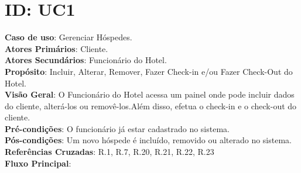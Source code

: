 \documentclass[notitlepage]{article}
\begin{document}
\section{ID: UC1}
\noindent\textbf{Caso de uso}: Gerenciar Hóspedes.\\
\textbf{Atores Primários}: Cliente. \\
\textbf{Atores Secundários}: Funcionário do Hotel.\\
\textbf{Propósito}: Incluir, Alterar, Remover, Fazer Check-in e/ou Fazer Check-Out do Hotel.\\
\textbf{Visão Geral}: O Funcionário do Hotel acessa um painel onde pode incluir dados do cliente, alterá-los ou removê-los.Além disso, efetua o check-in e o check-out do cliente.\\
\textbf{Pré-condições}: O funcionário já estar cadastrado no sistema.\\
\textbf{Pós-condições}: Um novo hóspede é incluído, removido ou alterado no sistema.\\
\textbf{Referências Cruzadas}: R.1, R.7, R.20, R.21, R.22, R.23\\
\newline
\textbf{Fluxo Principal}:\\
\end{document}

